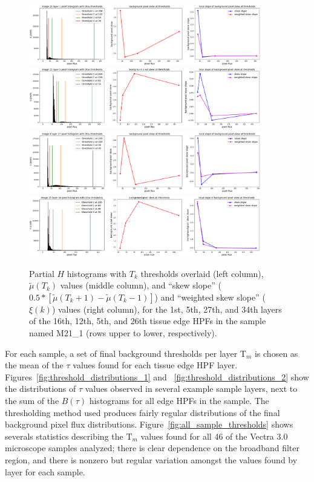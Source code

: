 \documentclass[letterpaper,11pt]{article}
\newcommand{\reffig}[1]{Figure~\ref{#1}}
\newcommand{\Tau}{\mathrm{T}}
\begin{document}
\begin{figure}[!ht]
\centering
\includegraphics[width=0.9\textwidth]{images/masking/thresholds_image_15_layer_1}
\includegraphics[width=0.9\textwidth]{images/masking/thresholds_image_11_layer_5}
\includegraphics[width=0.9\textwidth]{images/masking/thresholds_image_4_layer_27}
\includegraphics[width=0.9\textwidth]{images/masking/thresholds_image_25_layer_34}
\caption{\footnotesize Partial $H$ histograms with $T_{k}$ thresholds overlaid (left column), $\widetilde{\mu}(T_{k})$ values (middle column), and ``skew slope'' ($0.5*\left[\widetilde{\mu}(T_{k}+1) - \widetilde{\mu}(T_{k}-1)\right]$) and ``weighted skew slope'' ($\xi(k)$) values (right column), for the 1st, 5th, 27th, and 34th layers of the 16th, 12th, 5th, and 26th tissue edge HPFs in the sample named M21\_1 (rows upper to lower, respectively).}
\label{fig:histograms_with_otsu_thresholds}
\end{figure}

For each sample, a set of final background thresholds per layer $\Tau_{m}$ is chosen as the mean of the $\tau$ values found for each tissue edge HPF layer. Figures~\ref{fig:threshold_distributions_1} and ~\ref{fig:threshold_distributions_2} show the distributions of $\tau$ values observed in several example sample layers, next to the sum of the $B(\tau)$ histograms for all edge HPFs in the sample. The thresholding method used produces fairly regular distributions of the final background pixel flux distributions. \reffig{fig:all_sample_thresholds} shows severals statistics describing the $\Tau_{m}$ values found for all 46 of the Vectra 3.0 microscope samples analyzed; there is clear dependence on the broadband filter region, and there is nonzero but regular variation amongst the values found by layer for each sample.
\end{document}
